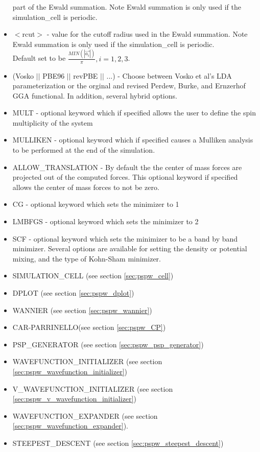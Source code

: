 \begin{itemize}
                          part of the Ewald summation. Note Ewald summation
                          is only used if the simulation\_cell is periodic.
        \item $<$rcut$>$ - value for the cutoff radius used
                          in the Ewald summation. Note Ewald summation
                          is only used if the simulation\_cell is periodic. \\
                           Default set to be
                          $\frac{MIN(\left| \vec{a_i} \right|)}{\pi}, i=1,2,3$.
        \item (Vosko $||$ PBE96 $||$ revPBE $||$ ...) - Choose between Vosko et al's LDA 
                               parameterization or the orginal and revised Perdew, Burke, 
                               and Ernzerhof GGA functional.  In addition, several hybrid options.
        \item MULT - optional keyword which if specified allows the user to define the spin multiplicity
                     of the system
        \item MULLIKEN - optional keyword which if specified
                         causes a Mulliken analysis to be performed at
                         the end of the simulation.  
        \item ALLOW\_TRANSLATION - By default the the center of mass forces are projected out of the 
                                  computed forces. This optional keyword if specified allows the 
                                  center of mass forces to not be zero.
        \item CG - optional keyword which sets the minimizer to 1
        \item LMBFGS - optional keyword which sets the minimizer to 2
        \item SCF - optional keyword which sets the minimizer to be a band by band minimizer.  Several
                    options are available for setting the density or potential mixing, and the type of
                    Kohn-Sham minimizer.
        \item SIMULATION\_CELL (see section \ref{sec:pspw_cell})
        \item DPLOT (see section \ref{sec:pspw_dplot})
        \item WANNIER (see section \ref{sec:pspw_wannier})
        \item CAR-PARRINELLO(see section \ref{sec:pspw_CP})
        \item PSP\_GENERATOR (see section \ref{sec:pspw_psp_generator})
        \item WAVEFUNCTION\_INITIALIZER (see section \ref{sec:pspw_wavefunction_initializer})
        \item V\_WAVEFUNCTION\_INITIALIZER (see section \ref{sec:pspw_v_wavefunction_initializer})
        \item WAVEFUNCTION\_EXPANDER (see section \ref{sec:pspw_wavefunction_expander}).
        \item STEEPEST\_DESCENT (see section \ref{sec:pspw_steepest_descent})


\end{itemize}
